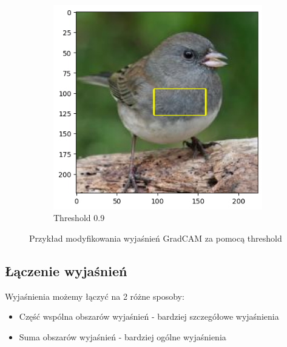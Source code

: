 \begin{figure}
\begin{subfigure}[b]{0.45\textwidth}
	\end{subfigure}
	\begin{subfigure}[b]{0.45\textwidth}
		\centering\includegraphics[width=.9\textwidth]{img/parameters/gradcam/threshold_09}
		\caption{Threshold 0.9}  \label{rys:parameters_lime_numsamples_1000}
	\end{subfigure}
	\caption{Przykład modyfikowania wyjaśnień GradCAM za pomocą threshold}

\end{figure}

\subsection*{Łączenie wyjaśnień}

Wyjaśnienia możemy łączyć na 2 różne sposoby:
\begin{itemize}
	\item Część wspólna obszarów wyjaśnień - bardziej szczegółowe wyjaśnienia
	\item Suma obszarów wyjaśnień - bardziej ogólne wyjaśnienia
\end{itemize}


